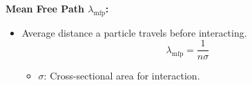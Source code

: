 \documentclass{article}
\begin{document}
\textbf{Mean Free Path \( \lambda_{\text{mfp}} \):}
\begin{itemize}
    \item Average distance a particle travels before interacting.
          \[
              \lambda_{\text{mfp}} = \frac{1}{n \sigma}
          \]
          \begin{itemize}
              \item \( \sigma \): Cross-sectional area for interaction.
          \end{itemize}
\end{itemize}
\end{document}
